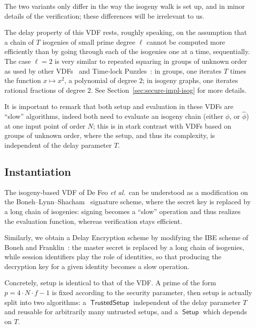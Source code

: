\documentclass{llncs}
\DeclareMathOperator{\Setup}{\mathsf{Setup}}
\DeclareMathOperator{\TSetup}{\mathsf{TrustedSetup}}
\begin{document}
The two variants only differ in the way the isogeny walk is set up,
and in minor details of the verification; these differences will be
irrelevant to us.

The delay property of this VDF rests, roughly speaking, on the
assumption that a chain of $T$ isogenies of small prime degree $\ell$
cannot be computed more efficiently than by going through each of the
isogenies one at a time, sequentially. %
The case $\ell=2$ is very similar to repeated squaring in groups of
unknown order as used by other VDFs~\cite{Wesolowski,Pietrzak} and
Time-lock Puzzles~\cite{TLP}: in groups, one iterates $T$ times the
function $x\mapsto x^2$, a polynomial of degree $2$; in isogeny graphs, one
iterates rational fractions of degree $2$. %
See Section~\ref{sec:secure-impl-isog} for more details.

It is important to remark that both setup and evaluation in these VDFs
are ``slow'' algorithms, indeed both need to evaluate an isogeny chain
(either $\phi$, or $\hat\phi$) at one input point of order $N$; this
is in stark contrast with VDFs based on groups of unknown order, where
the setup, and thus its complexity, is independent of the delay
parameter $T$.


\subsection{Instantiation}

The isogeny-based VDF of De Feo \emph{et al.}\ can be understood as a
modification on the Boneh--Lynn--Shacham~\cite{boneh+lynn+shacham04}
signature scheme, where the secret key is replaced by a long chain of
isogenies: signing becomes a ``slow'' operation and thus realizes the
evaluation function, whereas verification stays efficient.

Similarly, we obtain a Delay Encryption scheme by modifying the IBE
scheme of Boneh and Franklin~\cite{doi:10.1137/S0097539701398521}: the
master secret is replaced by a long chain of isogenies, while session
identifiers play the role of identities, so that producing the
decryption key for a given identity becomes a slow operation.

Concretely, setup is identical to that of the VDF. %
A prime of the form $p=4\cdot N\cdot f - 1$ is fixed according to the
security parameter, then setup is actually split into two algorithms:
a $\TSetup$ independent of the delay parameter $T$ and reusable for
arbitrarily many untrusted setups, and a $\Setup$ which depends on
$T$.
\end{document}
